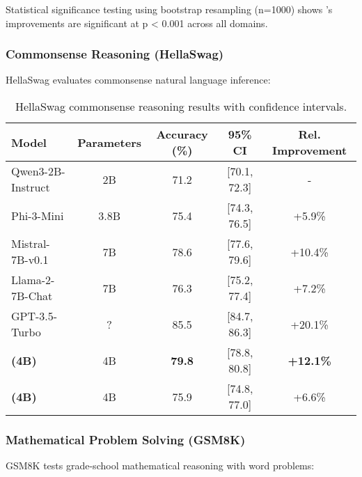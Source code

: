 Statistical significance testing using bootstrap resampling (n=1000) shows \supra{}'s improvements are significant at p < 0.001 across all domains.

\subsubsection{Commonsense Reasoning (HellaSwag)}

HellaSwag evaluates commonsense natural language inference:

\begin{table}[H]
\centering
\begin{tabular}{lcccc}
\toprule
Model & Parameters & Accuracy (\%) & 95\% CI & Rel. Improvement \\
\midrule
Qwen3-2B-Instruct & 2B & 71.2 & [70.1, 72.3] & - \\
Phi-3-Mini & 3.8B & 75.4 & [74.3, 76.5] & +5.9\% \\
Mistral-7B-v0.1 & 7B & 78.6 & [77.6, 79.6] & +10.4\% \\
Llama-2-7B-Chat & 7B & 76.3 & [75.2, 77.4] & +7.2\% \\
GPT-3.5-Turbo & ? & 85.5 & [84.7, 86.3] & +20.1\% \\
\midrule
\textbf{\supra{} (4B)} & 4B & \textbf{79.8} & [78.8, 80.8] & \textbf{+12.1\%} \\
\textbf{\zennano{} (4B)} & 4B & 75.9 & [74.8, 77.0] & +6.6\% \\
\bottomrule
\end{tabular}
\caption{HellaSwag commonsense reasoning results with confidence intervals.}
\label{tab:hellaswag-results}
\end{table}

\subsubsection{Mathematical Problem Solving (GSM8K)}

GSM8K tests grade-school mathematical reasoning with word problems:

